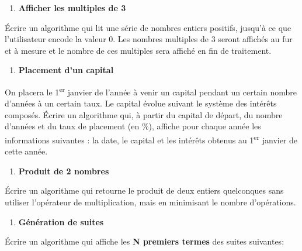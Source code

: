 \liststyleExercice
\setcounter{saveenum}{\value{enumi}}
\begin{enumerate}
\setcounter{enumi}{\value{saveenum}}
\item {\sffamily\bfseries
Afficher les multiples de 3}
\end{enumerate}
{
Écrire un algorithme qui lit une série de nombres entiers positifs,
jusqu’à ce que l’utilisateur encode la valeur 0. Les nombres multiples
de 3 seront affichés au fur et à mesure et le nombre de ces multiples
sera affiché en fin de traitement.}

\liststyleExercice
\setcounter{saveenum}{\value{enumi}}
\begin{enumerate}
\setcounter{enumi}{\value{saveenum}}
\item {\sffamily\bfseries
Placement d'un capital}
\end{enumerate}
{
On placera le 1\textsuperscript{er} janvier de l’année à venir un
capital pendant un certain nombre d’années à un certain taux. Le
capital évolue suivant le système des intérêts composés. Écrire un
algorithme qui, à partir du capital de départ, du nombre d’années et du
taux de placement (en \%), affiche pour chaque année les informations
suivantes : la date, le capital et les intérêts obtenus au
1\textsuperscript{er} janvier de cette année.}

\liststyleExercice
\setcounter{saveenum}{\value{enumi}}
\begin{enumerate}
\setcounter{enumi}{\value{saveenum}}
\item {\sffamily\bfseries
Produit de 2 nombres}
\end{enumerate}
{
Écrire un algorithme qui retourne le produit de deux entiers quelconques
sans utiliser l’opérateur de multiplication, mais en minimisant le
nombre d’opérations.}

\liststyleExercice
\setcounter{saveenum}{\value{enumi}}
\begin{enumerate}
\setcounter{enumi}{\value{saveenum}}
\item {\sffamily\bfseries
Génération de suites}
\end{enumerate}
{
Écrire un algorithme qui affiche les \textbf{N premiers termes} des
suites suivantes:}

